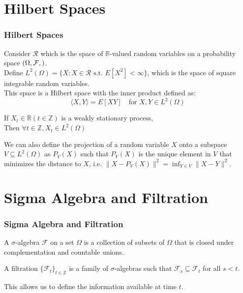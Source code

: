 \documentclass{beamer}
\let\P\relax
\newcommand{\P}{\mathbb{P}}
\newcommand{\R}{\mathbb{R}}
\newcommand{\Z}{\mathbb{Z}}
\begin{document}
\section{Hilbert Spaces}
\begin{frame}
    \frametitle{Hilbert Spaces}
    Consider $\mathscr{R}$ which is the space of $\mathbb{R}$-valued random variables on a probability space $(\Omega, \mathcal{F}, \P)$. \\
    Define $L^2(\Omega) = \{X: X \in \mathscr{R} \text{ s.t. } E[X^2] < \infty\}$, which is the space of square integrable random variables.\\
    This space is a Hilbert space with the inner product defined as:
        $$\langle X, Y \rangle = E[XY] \quad \text{for } X, Y \in L^2(\Omega)$$
    \begin{lemma}
        If $X_t \in \R (t \in \Z)$ is a weakly stationary process,\\
        Then $\forall t \in \Z, X_t \in L^2(\Omega)$ 
    \end{lemma}
    \begin{definition}
        We can also define the projection of a random variable $X$ onto a subspace $V \subseteq L^2(\Omega)$ as $P_V(X)$ 
        such that $P_V(X)$ is the unique element in $V$ that minimizes the distance to $X$, i.e. $\|X - P_V(X)\|^2 = \inf_{Y \in V} \|X - Y\|^2$.
    \end{definition}
\end{frame}

\section{Sigma Algebra and Filtration}
\begin{frame}
    \frametitle{Sigma Algebra and Filtration}
    \begin{definition}
        A $\sigma$-algebra $\mathcal{F}$ on a set $\Omega$ is a collection of subsets of $\Omega$ that is closed under complementation and countable unions.
    \end{definition}
    \begin{definition}[Filtration]
        A filtration $\{\mathcal{F}_t\}_{t \in \Z}$ is a family of $\sigma$-algebras such that $\mathcal{F}_s \subseteq \mathcal{F}_t$ for all $s < t$.
    \end{definition}
    This allows us to define the information available at time $t$.
\end{frame}
\end{document}
